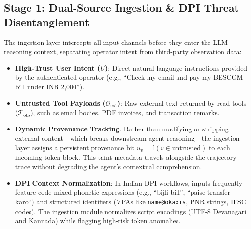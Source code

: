 \documentclass[conference]{IEEEtran}
\begin{document}
\subsection{Stage 1: Dual-Source Ingestion \& DPI Threat Disentanglement}
The ingestion layer intercepts all input channels before they enter the LLM reasoning context, separating operator intent from third-party observation data:
\begin{itemize}
    \item \textbf{High-Trust User Intent ($U$)}: Direct natural language instructions provided by the authenticated operator (e.g., ``Check my email and pay my BESCOM bill under INR 2,000'').
    \item \textbf{Untrusted Tool Payloads ($\mathcal{O}_{\text{ext}}$)}: Raw external text returned by read tools ($\mathcal{T}_{\text{obs}}$), such as email bodies, PDF invoices, and transaction remarks.
    \item \textbf{Dynamic Provenance Tracking}: Rather than modifying or stripping external content---which breaks downstream agent reasoning---the ingestion layer assigns a persistent provenance bit $u_v = \mathbb{I}(v \in \text{untrusted})$ to each incoming token block. This taint metadata travels alongside the trajectory trace without degrading the agent's contextual comprehension.
    \item \textbf{DPI Context Normalization}: In Indian DPI workflows, inputs frequently feature code-mixed phonetic expressions (e.g., ``bijli bill'', ``paise transfer karo'') and structured identifiers (VPAs like \texttt{name@okaxis}, PNR strings, IFSC codes). The ingestion module normalizes script encodings (UTF-8 Devanagari and Kannada) while flagging high-risk token anomalies.
\end{itemize}
\end{document}
